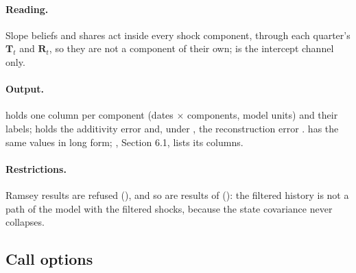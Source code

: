 \documentclass[11pt,a4paper]{article}
\newcommand{\T}{\mathbf{T}}
\newcommand{\Rs}{\mathbf{R}}
\begin{document}
\paragraph{Reading.} Slope beliefs and shares act inside every shock component, through each
quarter's $\T_t$ and $\Rs_t$, so they are not a component of their own;  is
the intercept channel only.

\paragraph{Output.}  holds one column per component (dates $\times$
components, model units) and  their labels;  holds the additivity
error and, under , the reconstruction error .
 has the same values in long form; , Section 6.1,
lists its columns.

\paragraph{Restrictions.} Ramsey results are refused (), and so are
results of  (): the filtered history
is not a path of the model with the filtered shocks, because the state covariance never collapses.

\subsection{Call options}
\end{document}
